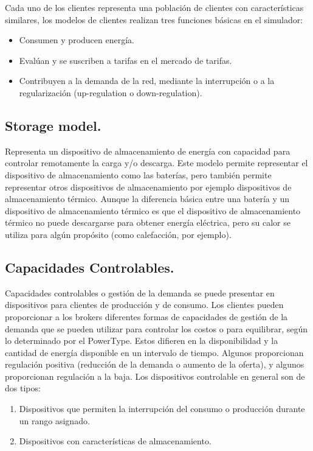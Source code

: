 Cada uno de los clientes representa una población de clientes con características similares, los modelos de clientes realizan tres funciones básicas en el simulador:

\begin{itemize}
	\item Consumen y producen energía.
	\item Evalúan y se suscriben  a tarifas en el mercado de tarifas.
	\item Contribuyen a la demanda de la red, mediante la interrupción o  a la regularización (up-regulation o down-regulation).	
\end{itemize}

\subsection{Storage model.}
Representa un dispositivo de almacenamiento de energía con capacidad para controlar remotamente la carga y/o descarga. Este modelo permite representar el dispositivo de almacenamiento como las baterías, pero también permite representar otros dispositivos de almacenamiento por ejemplo dispositivos de almacenamiento térmico. Aunque la diferencia básica entre una batería y un dispositivo de almacenamiento térmico es que el dispositivo de almacenamiento térmico no puede descargarse para obtener energía eléctrica, pero su calor se utiliza para algún propósito (como calefacción, por ejemplo).

\subsection{Capacidades Controlables.}
Capacidades controlables o gestión de la demanda se puede presentar en dispositivos para clientes de producción y de consumo. 
Los clientes pueden proporcionar a los brokers diferentes formas de capacidades de gestión de la demanda que se pueden utilizar para controlar los costos o para equilibrar, según lo determinado por el PowerType. Estos difieren en la disponibilidad y la cantidad de energía disponible en un intervalo de tiempo. Algunos proporcionan regulación positiva (reducción de la demanda o aumento de la oferta), y algunos proporcionan regulación a la baja. Los dispositivos controlable en general son de dos tipos: 
\begin{enumerate}
	\item Dispositivos que permiten la interrupción del consumo o producción durante un rango asignado.
	\item Dispositivos con características de almacenamiento.
\end{enumerate}

